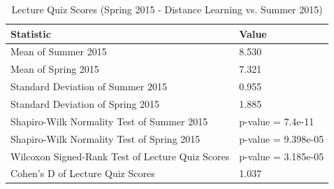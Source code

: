 \pagebreak\clearpage

\begin{small}
\begin{table}
  \centering
  \begin{tabular}{|l|l|}
    \hline
    \textbf{Statistic} & \textbf{Value} \\
	\hline
	Mean of Summer 2015 & 8.530 \\
	\hline
	Mean of Spring 2015 & 7.321 \\
	\hline
	Standard Deviation of Summer 2015 & 0.955 \\
	\hline
	Standard Deviation of Spring 2015 & 1.885 \\
	\hline
	Shapiro-Wilk Normality Test of Summer 2015 & p-value = 7.4e-11 \\
	\hline
	Shapiro-Wilk Normality Test of Spring 2015 & p-value = 9.398e-05 \\
	\hline
	Wilcoxon Signed-Rank Test of Lecture Quiz Scores & p-value = 3.185e-05 \\
	\hline
	Cohen's D of Lecture Quiz Scores & 1.037 \\
	\hline
  \end{tabular}
	\caption{Lecture Quiz Scores (Spring 2015 - Distance Learning vs. Summer 2015)}
  \label{tab:rqSp15dSu15}
\end{table}
\end{small}